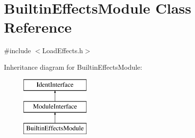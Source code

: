\hypertarget{class_builtin_effects_module}{}\section{Builtin\+Effects\+Module Class Reference}
\label{class_builtin_effects_module}


{\ttfamily \#include $<$Load\+Effects.\+h$>$}

Inheritance diagram for Builtin\+Effects\+Module\+:\begin{figure}[H]
\begin{center}
\leavevmode
\includegraphics[height=3.000000cm]{class_builtin_effects_module}
\end{center}
\end{figure}
